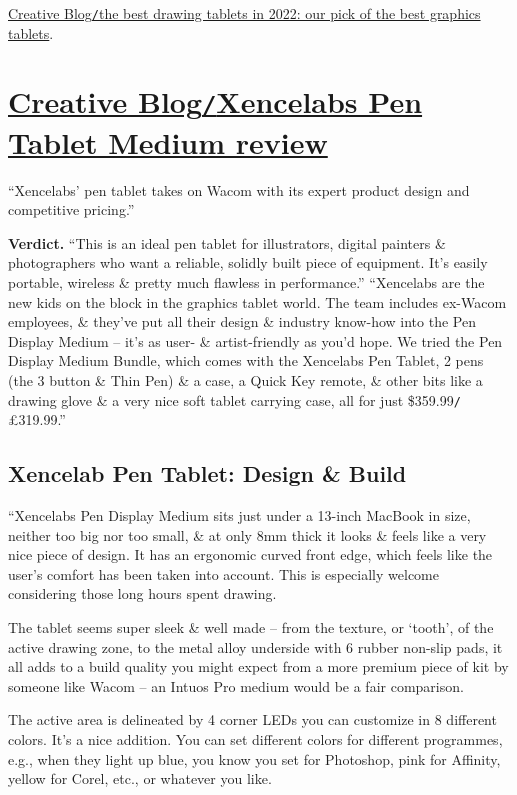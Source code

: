 \documentclass[oneside]{book}
\numberwithin{equation}{section}
\begin{document}
\href{https://www.creativebloq.com/features/best-drawing-tablet}{Creative Blog\texttt{/}the best drawing tablets in 2022: our pick of the best graphics tablets}.

\section{\href{https://www.creativebloq.com/reviews/xencelabs-pen-tablet-medium-bundle}{Creative Blog\texttt{/}Xencelabs Pen Tablet Medium review}}
``Xencelabs' pen tablet takes on Wacom with its expert product design and competitive pricing.''

\textbf{Verdict.} ``This is an ideal pen tablet for illustrators, digital painters \& photographers who want a reliable, solidly built piece of equipment. It's easily portable, wireless \& pretty much flawless in performance.'' ``Xencelabs are the new kids on the block in the graphics tablet world. The team includes ex-Wacom employees, \& they've put all their design \& industry know-how into the Pen Display Medium -- it's as user- \& artist-friendly as you'd hope. We tried the Pen Display Medium Bundle, which comes with the Xencelabs Pen Tablet, 2 pens (the 3 button \& Thin Pen) \& a case, a Quick Key remote, \& other bits like a drawing glove \& a very nice soft tablet carrying case, all for just \$359.99\texttt{/}\pounds319.99.''

\subsection{Xencelab Pen Tablet: Design \& Build}
``Xencelabs Pen Display Medium sits just under a 13-inch MacBook in size, neither too big nor too small, \& at only 8mm thick it looks \& feels like a very nice piece of design. It has an ergonomic curved front edge, which feels like the user's comfort has been taken into account. This is especially welcome considering those long hours spent drawing.

The tablet seems super sleek \& well made -- from the texture, or `tooth', of the active drawing zone, to the metal alloy underside with 6 rubber non-slip pads, it all adds to a build quality you might expect from a more premium piece of kit by someone like Wacom -- an Intuos Pro medium would be a fair comparison.

The active area is delineated by 4 corner LEDs you can customize in 8 different colors. It's a nice addition. You can set different colors for different programmes, e.g., when they light up blue, you know you set for Photoshop, pink for Affinity, yellow for Corel, etc., or whatever you like.
\end{document}
